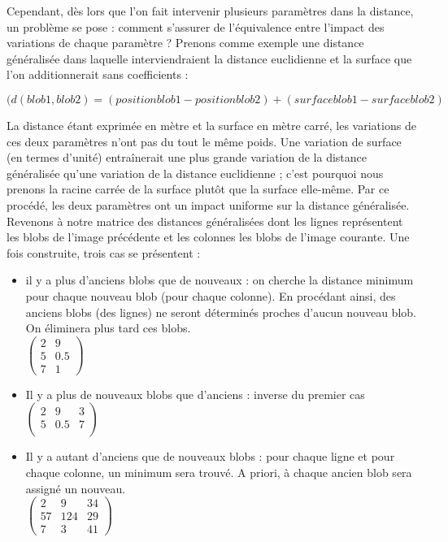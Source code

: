 Cependant, dès lors que l’on fait intervenir plusieurs paramètres dans la distance, un problème
se pose : comment s’assurer de l’équivalence entre l’impact des variations de chaque paramètre ?
Prenons comme exemple une distance généralisée dans laquelle interviendraient la distance
euclidienne et la surface que l’on additionnerait sans coefficients :
\begin{framed}
$$(d(blob1, blob2) = (position blob1 - position blob2) 
				+ (surface blob1 - surface blob2 )$$
\end{framed}
La distance étant exprimée en mètre et la surface en mètre carré, les variations de ces deux paramètres
n’ont pas du tout le même poids. Une variation de surface (en termes d’unité) entraînerait une plus
grande variation de la distance généralisée qu’une variation de la distance euclidienne ; c’est pourquoi 
nous prenons la racine carrée de la surface plutôt que la surface elle-même. Par ce
procédé, les deux paramètres ont un impact uniforme sur la distance généralisée.\\

Revenons à notre matrice des distances généralisées dont les lignes représentent les blobs de
l’image précédente et les colonnes les blobs de l’image courante. Une fois construite, trois cas se
présentent :
\begin{itemize}
 \item il y a plus d’anciens blobs que de nouveaux : on cherche la distance minimum pour
chaque nouveau blob (pour chaque colonne). En procédant ainsi, des anciens blobs
(des lignes) ne seront déterminés proches d’aucun nouveau blob. On éliminera plus
tard ces blobs.\\

$\begin{pmatrix}
   2 & 9\\
   5 & 0.5\\
   7 & 1
\end{pmatrix}$\\

  \item Il y a plus de nouveaux blobs que d’anciens : inverse du premier cas\\
  
$\begin{pmatrix}
   2 & 9 & 3\\
   5 & 0.5 & 7\\
\end{pmatrix}$\\

  \item Il y a autant d’anciens que de nouveaux blobs : pour chaque ligne et pour chaque
colonne, un minimum sera trouvé. A priori, à chaque ancien blob sera assigné un nouveau.\\

$\begin{pmatrix}
   2 & 9 & 34\\
   57 & 124 & 29\\
   7 & 3 & 41
\end{pmatrix}$\\

\end{itemize}


